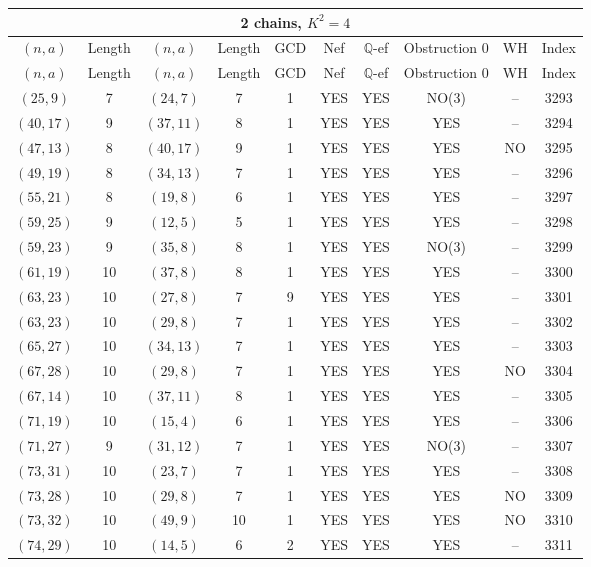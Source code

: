 \begin{longtable}{|c|c|c|c|c|c|c|c|c|c|}
\hline
\multicolumn{10}{|c|}{2 chains, $K^2 = 4$}\\
\hline
$(n,a)$ & Length & $(n,a)$ & Length & GCD & Nef & $\mathbb Q$-ef & Obstruction 0 & WH & Index\\
\hline
\endfirsthead

\hline
$(n,a)$ & Length & $(n,a)$ & Length & GCD & Nef & $\mathbb Q$-ef & Obstruction 0 & WH & Index\\
\hline
\endhead
\hline
\endfoot

$(25, 9)$ & 7 & $(24, 7)$ & 7 & 1 & YES & YES & NO(3) & -- & 3293\\
$(40, 17)$ & 9 & $(37, 11)$ & 8 & 1 & YES & YES & YES & -- & 3294\\
$(47, 13)$ & 8 & $(40, 17)$ & 9 & 1 & YES & YES & YES & NO & 3295\\
$(49, 19)$ & 8 & $(34, 13)$ & 7 & 1 & YES & YES & YES & -- & 3296\\
$(55, 21)$ & 8 & $(19, 8)$ & 6 & 1 & YES & YES & YES & -- & 3297\\
$(59, 25)$ & 9 & $(12, 5)$ & 5 & 1 & YES & YES & YES & -- & 3298\\
$(59, 23)$ & 9 & $(35, 8)$ & 8 & 1 & YES & YES & NO(3) & -- & 3299\\
$(61, 19)$ & 10 & $(37, 8)$ & 8 & 1 & YES & YES & YES & -- & 3300\\
$(63, 23)$ & 10 & $(27, 8)$ & 7 & 9 & YES & YES & YES & -- & 3301\\
$(63, 23)$ & 10 & $(29, 8)$ & 7 & 1 & YES & YES & YES & -- & 3302\\
$(65, 27)$ & 10 & $(34, 13)$ & 7 & 1 & YES & YES & YES & -- & 3303\\
$(67, 28)$ & 10 & $(29, 8)$ & 7 & 1 & YES & YES & YES & NO & 3304\\
$(67, 14)$ & 10 & $(37, 11)$ & 8 & 1 & YES & YES & YES & -- & 3305\\
$(71, 19)$ & 10 & $(15, 4)$ & 6 & 1 & YES & YES & YES & -- & 3306\\
$(71, 27)$ & 9 & $(31, 12)$ & 7 & 1 & YES & YES & NO(3) & -- & 3307\\
$(73, 31)$ & 10 & $(23, 7)$ & 7 & 1 & YES & YES & YES & -- & 3308\\
$(73, 28)$ & 10 & $(29, 8)$ & 7 & 1 & YES & YES & YES & NO & 3309\\
$(73, 32)$ & 10 & $(49, 9)$ & 10 & 1 & YES & YES & YES & NO & 3310\\
$(74, 29)$ & 10 & $(14, 5)$ & 6 & 2 & YES & YES & YES & -- & 3311\\

\end{longtable}
